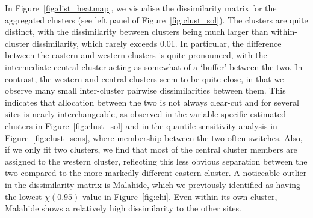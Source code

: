 \documentclass[12pt,compact]{article}
\begin{document}
In Figure~\ref{fig:dist_heatmap}, we visualise the dissimilarity matrix for the aggregated clusters (see left panel of Figure~\ref{fig:clust_sol}).
The clusters are quite distinct, with the dissimilarity between clusters being much larger than within-cluster dissimilarity, which rarely exceeds 0.01.
In particular, the difference between the eastern and western clusters is quite pronounced, with the intermediate central cluster acting as somewhat of a `buffer' between the two.
In contrast, the western and central clusters seem to be quite close, in that we observe many small inter-cluster pairwise dissimilarities between them. 
This indicates that allocation between the two is not always clear-cut and for several sites is nearly interchangeable, as observed in  the variable-specific estimated clusters in Figure~\ref{fig:clust_sol} and in the quantile sensitivity analysis in Figure~\ref{fig:clust_sens}, where membership between the two often switches. %
Also, if we only fit two clusters, we find that most of the central cluster members are assigned to the western cluster, reflecting this less obvious separation between the two compared to the more markedly different eastern cluster. 
A noticeable outlier in the dissimilarity matrix is Malahide, which we previously identified as having the lowest $\chi(0.95)$ value  in Figure~\ref{fig:chi}. 
Even within its own cluster, Malahide shows a relatively high dissimilarity to the other sites. 
\end{document}
